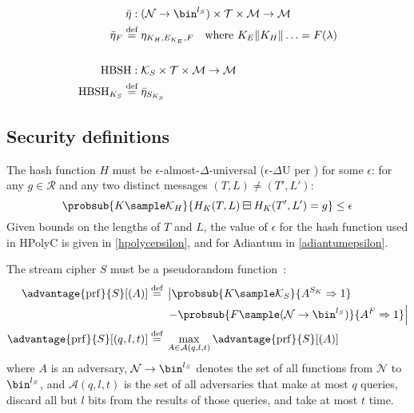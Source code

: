 \documentclass[eprint.tex]{subfiles}
\begin{document}
\begin{align*}
    \bar{\eta} :{}& (\mathcal{N} \rightarrow \bin^{l_S}) \times \mathcal{T} \times \mathcal{M} \rightarrow \mathcal{M} \\
    \bar{\eta}_{F} \defeq{}& \eta_{K_H, E_{K_E}, F} \quad \textrm{where} \ K_E \Concat K_H \Concat \ldots = F(\lambda) \\
    \allowdisplaybreaks[4] \vphantom{|} \\ \allowdisplaybreaks[0]
    \HBSH :{}& \mathcal{K}_S \times \mathcal{T} \times \mathcal{M} \rightarrow \mathcal{M} \\
    \HBSH_{K_S} \defeq{}& \bar{\eta}_{S_{K_S}} \\
\end{align*}

\subsection{Security definitions}
The hash function $H$
must be $\epsilon$-almost-$\Delta$-universal\label{eadudef}
($\epsilon$-$\Delta$U per \cite{eadu})
for some $\epsilon$:
for any $g \in \mathcal{R}$ and
any two distinct messages $(T, L) \neq (T', L')$:
%
\begin{displaymath}
\probsub{K \sample \mathcal{K}_H}{H_{K}(T, L) \boxminus H_{K}(T', L') = g} \leq \epsilon
\end{displaymath}
%
Given bounds on the lengths of $T$ and $L$, the value of $\epsilon$ for the
hash function used in HPolyC is given in \autoref{hpolycepsilon},
and for Adiantum in \autoref{adiantumepsilon}.

The stream cipher $S$
must be a pseudorandom function~\cite{concsym}:
%
\begin{align*}
    \advantage{\mathrm{prf}}{S}[(A)] \defeq
    {}&\left\lvert \probsub{K \sample \mathcal{K}_S}{A^{S_{K}}\Rightarrow 1}\right.
    \\
    {}&\left. - \probsub{F \sample (\mathcal{N} \rightarrow \bin^{l_S})}
    {A^F\Rightarrow 1} \right\rvert
    \\
    \advantage{\mathrm{prf}}{S}[(q, l, t)]
    \defeq {}&\max_{A \in \mathcal{A}(q, l, t)} \advantage{\mathrm{prf}}{S}[(A)]
\end{align*}
%
where $A$ is an adversary,
$\mathcal{N} \rightarrow \bin^{l_S}$ denotes the set of all
functions from $\mathcal{N}$ to $\bin^{l_S}$,
and
$\mathcal{A}(q, l, t)$
is the set of all adversaries that make at most $q$ queries, discard all but $l$ bits from
the results of those queries, and take at most $t$ time.
\end{document}
